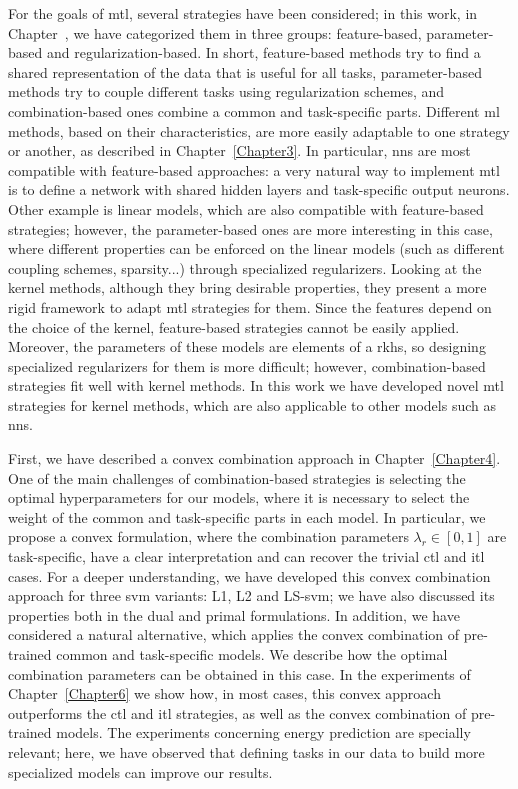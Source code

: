 For the goals of \acrshort{mtl}, several strategies have been considered; in this work, in Chapter~, we have categorized them in three groups: feature-based, parameter-based and regularization-based.
In short, feature-based methods try to find a shared representation of the data that is useful for all tasks, parameter-based methods try to couple different tasks using regularization schemes, and combination-based ones combine a common and task-specific parts.
Different \acrshort{ml} methods, based on their characteristics, are more easily adaptable to one strategy or another, as described in Chapter~\ref{Chapter3}. In particular, \acrfull{nns} are most compatible with feature-based approaches: a very natural way to implement \acrshort{mtl} is to define a network with shared hidden layers and task-specific output neurons.
Other example is linear models, which are also compatible with feature-based strategies; however, the parameter-based ones are more interesting in this case, where different properties can be enforced on the linear models (such as different coupling schemes, sparsity...) through specialized regularizers.
Looking at the kernel methods, although they bring desirable properties, they present a more rigid framework to adapt \acrshort{mtl} strategies for them. Since the features depend on the choice of the kernel, feature-based strategies cannot be easily applied. Moreover, the parameters of these models are elements of a \acrfull{rkhs}, so designing specialized regularizers for them is more difficult; however, combination-based strategies fit well with kernel methods.
%
In this work we have developed novel \acrshort{mtl} strategies for kernel methods, which are also applicable to other models such as \acrshort{nns}.


%
First, we have described a convex combination approach in Chapter~\ref{Chapter4}. One of the main challenges of combination-based strategies is selecting the optimal hyperparameters for our models, where it is necessary to select the weight of the common and task-specific parts in each model. In particular, we propose a convex formulation, where the combination parameters $\lambda_r \in [0, 1]$ are task-specific, have a clear interpretation and can recover the trivial \acrshort{ctl} and \acrshort{itl} cases.
%
For a deeper understanding, we have developed this convex combination approach for three \acrshort{svm} variants: L1, L2 and LS-\acrshort{svm}; we have also discussed its properties both in the dual and primal formulations.
%
In addition, we have considered a natural alternative, which applies the convex combination of pre-trained common and task-specific models. We describe how the optimal combination parameters can be obtained in this case.
%
In the experiments of Chapter~\ref{Chapter6} we show how, in most cases, this convex approach outperforms the \acrshort{ctl} and \acrshort{itl} strategies, as well as the convex combination of pre-trained models.
The experiments concerning energy prediction are specially relevant; here, we have observed that defining tasks in our data to build more specialized models can improve our results.

